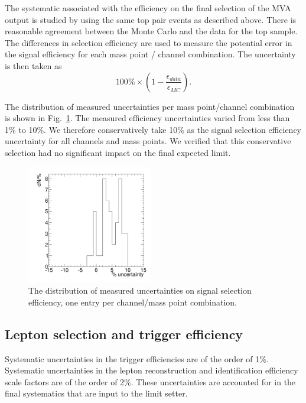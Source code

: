 The systematic associated with the efficiency on the final selection
of the MVA output
is studied by using the same
top pair events as described above.  There is reasonable agreement
between the Monte Carlo and the data for the top sample. The
differences in selection efficiency are used to measure the potential
error in the signal efficiency for each mass point / channel
combination. The uncertainty is then taken as
\[
 100\% \times (1 - \frac{\epsilon_{data}}{\epsilon_{MC}}).
\]

The distribution of measured uncertainties per mass point/channel
combination is shown in Fig.~\ref{fig:sys:sigseleffuncdist}. The measured
efficiency uncertainties varied from less than 1\% to 10\%.
We therefore conservatively take 10\%
as the signal selection efficiency uncertainty for all channels and
mass points.
We verified that
this conservative selection had no significant impact on the final
expected limit.

\begin{figure}[htb]
\center
  \includegraphics[width=0.49\textwidth]{plots/anaexample/sigseleffuncdist.pdf}
  \caption{The distribution of measured uncertainties on signal
selection efficiency, one entry per channel/mass point
combination.
}
\label{fig:sys:sigseleffuncdist}
\end{figure}

\subsection{Lepton selection and trigger efficiency}
Systematic uncertainties in the trigger efficiencies
are of the order of 1\%. Systematic uncertainties in the lepton reconstruction
and identification efficiency scale factors are of the order of 2\%. These uncertainties
are accounted for in the final systematics that are input to the limit setter.

